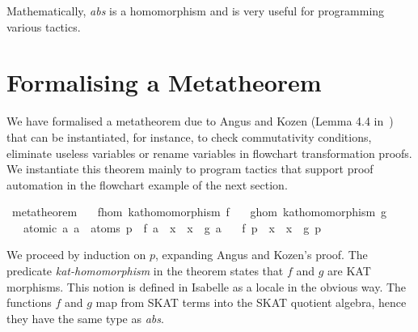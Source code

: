 \documentclass{llncs}
\begin{document}
\noindent Mathematically, \textit{abs} is a homomorphism and is very
useful for programming various tactics.


\section{Formalising a Metatheorem}
\label{sec:metatheorem}

We have formalised a metatheorem due to Angus and Kozen (Lemma 4.4
in~\cite{Angus}) that can be instantiated, for instance, to check
commutativity conditions, eliminate useless variables or rename
variables in flowchart transformation proofs. We instantiate this
theorem mainly to program tactics that support proof automation in the
flowchart example of the next section.

\begin{isabellebody}
\isanewline
{}\isamarkupfalse%
\ metatheorem{}\isanewline
\ \ \ f{}hom{}\ {}kat{}homomorphism\ f{}\isanewline
\ \ \ g{}hom{}\ {}kat{}homomorphism\ g{}\isanewline
\ \ \ atomic{}\ {}{}a{}\ a\ {}\ atoms\ p\ {}\ f\ a\ {}\ x\ {}\ x\ {}\ g\ a{}\isanewline
\ \ \ {}f\ p\ {}\ x\ {}\ x\ {}\ g\ p{}\isanewline
\end{isabellebody}

\noindent We proceed by induction on $p$, expanding Angus and Kozen's
proof. The predicate \textit{kat-homomorphism} in the theorem states
that $f$ and $g$ are KAT morphisms. This notion is defined in Isabelle
as a locale in the obvious way. The functions $f$ and $g$ map from
SKAT terms into the SKAT quotient algebra, hence they have the same
type as \textit{abs}.
\end{document}
